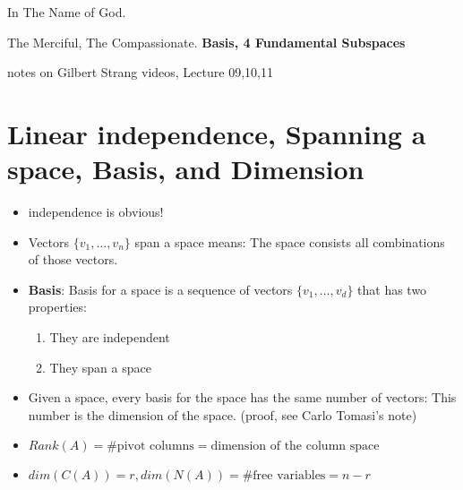 \documentclass[a4paper,12pt]{article}
\begin{document}
\begin{center}
In The Name of God.

The Merciful, The Compassionate.
\vskip 1cm
{\Large\bfseries{Basis, 4 Fundamental Subspaces}}

\vskip 0.2cm
\tiny{notes on Gilbert Strang videos, Lecture 09,10,11}
\end{center}

\section{Linear independence, Spanning a space, Basis, and Dimension}
\begin{itemize}
	\item independence is obvious!
	\item Vectors $\{v_1, \ldots, v_n\}$ span a space means: The space consists all combinations of those vectors.
	\item \textbf{Basis}: Basis for a space is a sequence of vectors $\{v_1, \ldots, v_d\}$ that has two properties:
		\begin{enumerate}
			\item They are independent
			\item They span a space
		\end{enumerate}
	\item Given a space, every basis for the space has the same number of vectors: This number is the dimension of the space. (proof, see Carlo Tomasi's note)
	\item $Rank(A)= \# \text{pivot columns} = \text{dimension of the column space}$
	\item $dim(C(A)) = r, dim(N(A)) = \# \text{free variables} = n - r$
\end{itemize}
\end{document}

